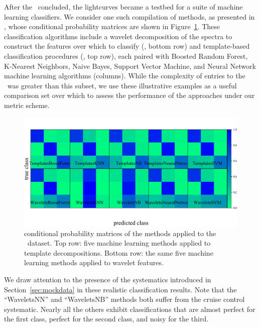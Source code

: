 After the \snphotcc\ concluded, the lightcurves became a testbed for a suite of machine learning classifiers.
We consider one such compilation of methods, as presented in \citet{lochner_photometric_2016}, whose conditional probability matrices are shown in Figure~\ref{fig:snphotcc_cm}.
These classification algorithms include a wavelet decomposition of the spectra to construct the features over which to classify (\citet{2011MNRAS.414.1987N}, bottom row) and template-based classification procedures (\citet{2011ApJ...738..162S}, top row), each paired with Boosted Random Forest, K-Nearest Neighbors, Naive Bayes, Support Vector Machine, and Neural Network machine learning algorithms (columns).
While the complexity of entries to the \snphotcc\ was greater than this subset, we use these illustrative examples as a useful comparison set over which to assess the performance of the approaches under our metric scheme.

\begin{figure}
	\begin{center}
    \includegraphics[width=\textwidth]{./fig/all_snphotcc_cm.png}
		\caption{conditional probability matrices of the \citet{lochner_photometric_2016} methods applied to the \snphotcc\ dataset.
    Top row: five machine learning methods applied to template decompositions.
    Bottom row: the same five machine learning methods applied to wavelet features.}
		\label{fig:snphotcc_cm}
	\end{center}
\end{figure}

We draw attention to the presence of the systematics introduced in Section~\ref{sec:mockdata} in these realistic classification results.
Note that the ``WaveletsNN'' and ``WaveletsNB'' methods both suffer from the cruise control systematic.
Nearly all the others exhibit classifications that are almost perfect for the first class, perfect for the second class, and noisy for the third.

%
